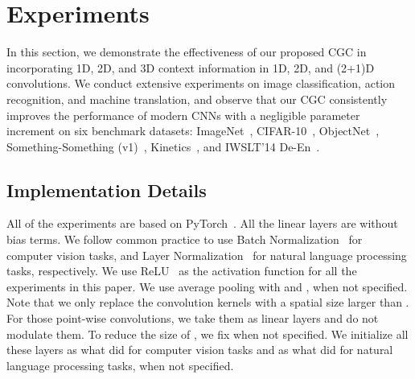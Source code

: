 \documentclass[runningheads]{llncs}
\begin{document}
\section{Experiments}
In this section, we demonstrate the effectiveness of our proposed CGC in incorporating 1D, 2D, and 3D context information in 1D, 2D, and (2+1)D convolutions. We conduct extensive experiments on image classification, action recognition, and machine translation, and observe that our CGC consistently improves the performance of modern CNNs with a negligible parameter increment on six benchmark datasets: ImageNet~\cite{russakovsky2015imagenet}, CIFAR-10~\cite{krizhevsky2009learning}, ObjectNet~\cite{barbu2019objectnet}, Something-Something (v1)~\cite{Goyal_2017_ICCV}, Kinetics~\cite{Kinetics}, and IWSLT'14 De-En~\cite{cettolo2014report}.

\subsection{Implementation Details}

All of the experiments are based on PyTorch~\cite{pytorch}. All the linear layers are without bias terms. We follow common practice to use Batch Normalization~\cite{ioffe2015batch} for computer vision tasks, and Layer Normalization~\cite{ba2016layer} for natural language processing tasks, respectively. We use ReLU~\cite{nair2010rectified} as the activation function for all the experiments in this paper. We use average pooling with  and , when not specified. Note that we only replace the convolution kernels with a spatial size larger than . For those point-wise convolutions, we take them as linear layers and do not modulate them. To reduce the size of , we fix  when not specified. We initialize all these layers as what \cite{He_2015} did for computer vision tasks and as what \cite{pmlr-v9-glorot10a} did for natural language processing tasks, when not specified.
\end{document}
